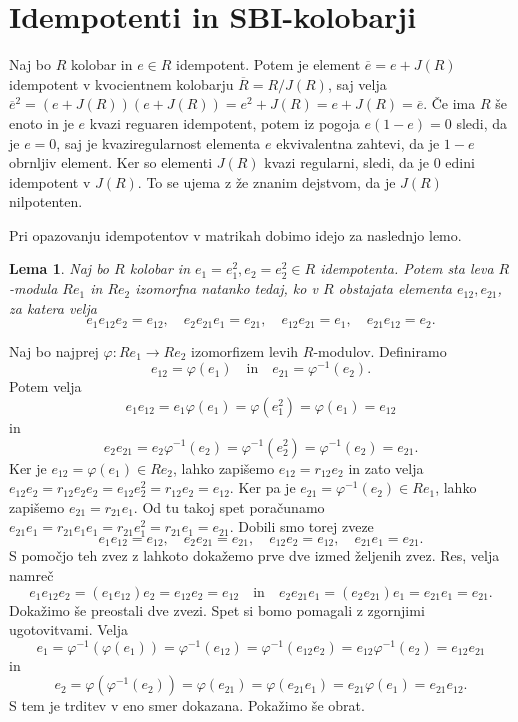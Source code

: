 \documentclass[a4paper, 12pt]{amsart}
\theoremstyle{definition} %
\theoremstyle{plain} %
\newtheorem{lema}[definicija]{Lema}
\begin{document}
\section{Idempotenti in SBI-kolobarji}

Naj bo $R$ kolobar in $e\in R$ idempotent. Potem je element $\overline{e} = e + J(R)$ idempotent v kvocientnem kolobarju $\overline{R}=R/J(R)$, saj velja $\overline{e}^2 = (e+J(R)) (e+J(R)) = e^2 + J(R) = e+J(R) = \overline{e}$. Če ima $R$ še enoto in je $e$ kvazi reguaren idempotent, potem iz pogoja $e(1-e) = 0$ sledi, da je $e=0$, saj je kvaziregularnost elementa $e$ ekvivalentna zahtevi, da je $1-e$ obrnljiv element. Ker so elementi $J(R)$ kvazi regularni, sledi, da je $0$ edini idempotent v $J(R)$. To se ujema z že znanim dejstvom, da je $J(R)$ nilpotenten. 

Pri opazovanju idempotentov v matrikah dobimo idejo za naslednjo lemo.

\begin{lema}
\label{izomorfniPodmoduliElementi}
Naj bo $R$ kolobar in $e_1 = e_1^2 , e_2=e_2^2\in R$ idempotenta. Potem sta leva $R$-modula $Re_1$ in $Re_2$ izomorfna natanko tedaj, ko v $R$ obstajata elementa $e_{12}, e_{21}$, za katera velja
$$
e_1 e_{12} e_2 = e_{12}, \quad e_2 e_{21} e_1 = e_{21}, \quad e_{12}e_{21} = e_1, \quad e_{21}e_{12} = e_2.
$$
\end{lema}

\proof
Naj bo najprej $\varphi : Re_1 \rightarrow Re_2$ izomorfizem levih $R$-modulov. Definiramo 
$$
e_{12} = \varphi(e_1) \quad \text{in} \quad e_{21} = \varphi^{-1}(e_2).
$$
Potem velja 
$$
e_1 e_{12} = e_1\varphi(e_1) = \varphi(e_1^2) = \varphi(e_1) = e_{12}
$$
in
$$
e_2 e_{21} = e_2\varphi^{-1}(e_2) = \varphi^{-1}(e_2^2) = \varphi^{-1}(e_2) = e_{21}.
$$
Ker je $e_{12} = \varphi (e_1) \in Re_2$, lahko zapišemo $e_{12} = r_{12}e_2$ in zato velja $e_{12}e_2 = r_{12}e_2 e_2 = e_{12}e_2^2 = r_{12}e_2 = e_{12}$. Ker pa je $e_{21} = \varphi^{-1}(e_2) \in Re_1$, lahko zapišemo $e_{21} = r_{21}e_1$. Od tu takoj spet poračunamo $e_{21}e_1 = r_{21}e_1e_1 = r_{21}e_1^2 = r_{21}e_1=e_{21}$. Dobili smo torej zveze
$$
e_1e_{12} = e_{12},\quad  e_2 e_{21} = e_{21}, \quad e_{12} e_2 = e_{12}, \quad e_{21} e_1 = e_{21}.
$$
S pomočjo teh zvez z lahkoto dokažemo prve dve izmed željenih zvez. Res, velja namreč 
$$
e_1 e_{12} e_2 = (e_1 e_{12}) e_2 = e_{12} e_2 = e_{12}\quad \text{in}\quad e_2 e_{21}e_1 = (e_2 e_{21}) e_1 = e_{21}e_1 = e_{21}.
$$
Dokažimo še preostali dve zvezi. Spet si bomo pomagali z zgornjimi ugotovitvami. Velja
$$
e_1 = \varphi^{-1}(\varphi(e_1)) = \varphi^{-1}(e_{12}) = \varphi^{-1}(e_{12} e_2) = e_{12} \varphi^{-1}(e_2) = e_{12} e_{21}
$$
in
$$
e_2 = \varphi(\varphi^{-1}(e_2)) = \varphi(e_{21}) = \varphi(e_{21}e_1)=e_{21}\varphi(e_1) = e_{21} e_{12}.
$$
S tem je trditev v eno smer dokazana. Pokažimo še obrat.
\end{document}
